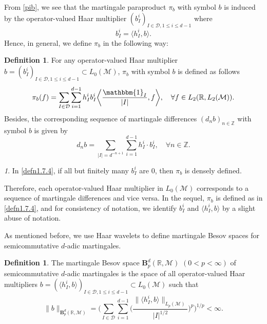 \documentclass[oneside,english,a4wide]{amsart}
\numberwithin{equation}{section}
\numberwithin{figure}{section}
\theoremstyle{plain}
\theoremstyle{plain}
\theoremstyle{definition}
\theoremstyle{plain}
\theoremstyle{remark}
\newtheorem{rem}[thm]{\protect\remarkname}
\theoremstyle{definition}
\newtheorem{definition}[thm]{Definition}
\theoremstyle{remark}
\theoremstyle{definition}
\providecommand{\remarkname}{Remark}
\newcommand{\M}{{\mathcal M}}
\newcommand{\8}{\infty}
\begin{document}
From \eqref{pib}, we see that the martingale paraproduct $\pi_b$ with symbol $b$ is induced by the operator-valued Haar multiplier $(b_I^i)_{I\in \mathcal{D}, 1\leq i\leq d-1}$ where
$$  b_I^i= \langle h_I^i,b\rangle. $$
Hence, in general, we define $\pi_b$ in the following way: 
\begin{definition}
	For any operator-valued Haar multiplier $b=(b_I^i)_{I\in \mathcal{D}, 1\leq i\leq d-1}\subset L_0(\M)$, $\pi_b$ with symbol $b$ is defined as follows
	\begin{equation}\label{defn1.7.4}
		\begin{aligned}
			\pi_{b}(f)=\sum_{I\in \mathcal{D}}\sum_{i=1}^{d-1}h^i_I b_I^i \biggl\langle \frac{\mathbbm{1}_I}{|I|},f\biggr\rangle, \quad \forall f\in L_2(\mathbb{R},L_2(\mathcal{M})).
		\end{aligned}
	\end{equation}
	Besides, the corresponding sequence of martingale differences $(d_n b)_{n\in\mathbb{Z}}$ with symbol $b$ is given by
	\begin{equation}\label{dnb}
		d_n b= \sum_{|I|=d^{-n+1}}\sum_{i=1}^{d-1}h_I^i \cdot b_I^i, \quad \forall n\in \mathbb{Z}. 
	\end{equation}
\end{definition}
\begin{rem}
	In \eqref{defn1.7.4}, if all but finitely many $b_I^i$ are $0$, then $\pi_b$ is densely defined.
\end{rem}
Therefore, each operator-valued Haar multiplier in $L_0(\M)$ corresponds to a sequence of martingale differences and vice versa. In the sequel, $\pi_b$ is defined as in \eqref{defn1.7.4}, and for consistency of notation, we identify $b_I^i$ and $\langle h_I^i,b\rangle$ by a slight abuse of notation.


As mentioned before, we use Haar wavelets to define martingale Besov spaces for semicommutative $d$-adic martingales.
\begin{definition}\label{mbs1}
	The martingale Besov space $\pmb{B}_p^d(\mathbb{R},\M)$ $(0<p<\8)$ of semicommutative $d$-adic martingales is the space of all operator-valued Haar multipliers $b=(\langle h_I^i,b\rangle)_{I\in \mathcal{D}, 1\leq i\leq d-1}\subset L_0(\M)$ such that
	\begin{equation}\label{e1.2}
		\|b\|_{\pmb{B}_p^d(\mathbb{R},\M)}=\biggl(\sum_{I\in \mathcal{D}}\sum_{i=1}^{d-1}\biggl(\frac{\|\langle h_I^i,b\rangle\|_{L_p{(\mathcal{M})}}}{|I|^{1/2}}\biggr)^p\biggr)^{1/p}<\infty.
	\end{equation}
\end{definition}
\end{document}
